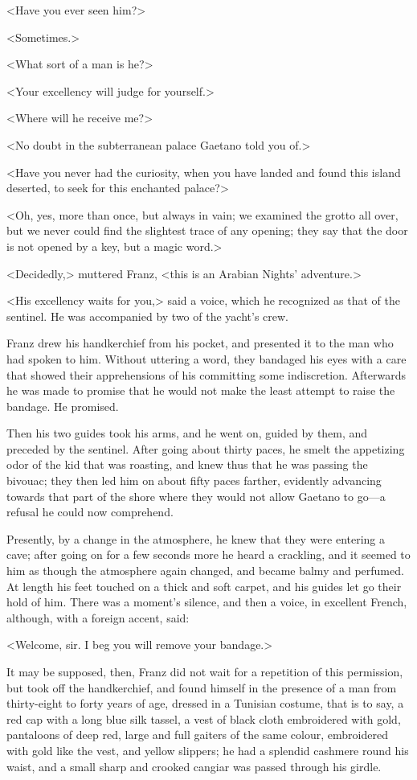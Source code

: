  <Have you ever seen him?> 

 <Sometimes.> 

 <What sort of a man is he?> 

 <Your excellency will judge for yourself.> 

 <Where will he receive me?> 

 <No doubt in the subterranean palace Gaetano told you of.> 

 <Have you never had the curiosity, when you have landed and found this island deserted, to seek for this enchanted palace?> 

 <Oh, yes, more than once, but always in vain; we examined the grotto all over, but we never could find the slightest trace of any opening; they say that the door is not opened by a key, but a magic word.> 

 <Decidedly,> muttered Franz, <this is an Arabian Nights' adventure.> 

 <His excellency waits for you,> said a voice, which he recognized as that of the sentinel. He was accompanied by two of the yacht's crew. 

 Franz drew his handkerchief from his pocket, and presented it to the man who had spoken to him. Without uttering a word, they bandaged his eyes with a care that showed their apprehensions of his committing some indiscretion. Afterwards he was made to promise that he would not make the least attempt to raise the bandage. He promised. 

 Then his two guides took his arms, and he went on, guided by them, and preceded by the sentinel. After going about thirty paces, he smelt the appetizing odor of the kid that was roasting, and knew thus that he was passing the bivouac; they then led him on about fifty paces farther, evidently advancing towards that part of the shore where they would not allow Gaetano to go—a refusal he could now comprehend. 

 Presently, by a change in the atmosphere, he knew that they were entering a cave; after going on for a few seconds more he heard a crackling, and it seemed to him as though the atmosphere again changed, and became balmy and perfumed. At length his feet touched on a thick and soft carpet, and his guides let go their hold of him. There was a moment's silence, and then a voice, in excellent French, although, with a foreign accent, said: 

 <Welcome, sir. I beg you will remove your bandage.> 

 It may be supposed, then, Franz did not wait for a repetition of this permission, but took off the handkerchief, and found himself in the presence of a man from thirty-eight to forty years of age, dressed in a Tunisian costume, that is to say, a red cap with a long blue silk tassel, a vest of black cloth embroidered with gold, pantaloons of deep red, large and full gaiters of the same colour, embroidered with gold like the vest, and yellow slippers; he had a splendid cashmere round his waist, and a small sharp and crooked cangiar was passed through his girdle. 

